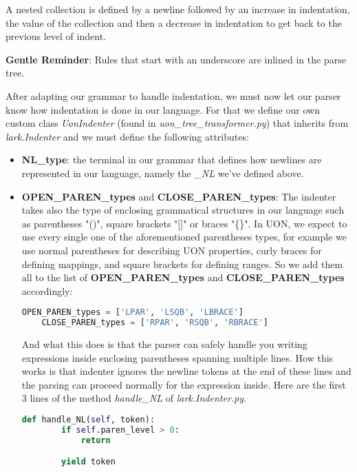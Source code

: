 \documentclass[12pt]{article}
\begin{document}
A nested collection is defined by a newline followed by an increase in indentation, the value of the collection and then a decrease in indentation to get back to the previous level of indent.

\textbf{Gentle Reminder}: Rules that start with an underscore are inlined in the parse tree.

After adapting our grammar to handle indentation, we must now let our parser know how indentation is done in our language. For that we define our own custom class \emph{UonIndenter} (found in \emph{uon\_tree\_transformer.py}) that inherits from \emph{lark.Indenter} and we must define the following attributes:
\begin{itemize}
    \item \textbf{NL\_type}: the terminal in our grammar that defines how newlines are represented in our language, namely the \emph{\_NL} we've defined above.
    \item \textbf{OPEN\_PAREN\_types} and \textbf{CLOSE\_PAREN\_types}: The indenter takes also the type of enclosing grammatical structures in our language such as parentheses "()", square brackets "[]" or braces "\{\}". In UON, we expect to use every single one of the aforementioned parentheses types, for example we use normal parentheses for describing UON properties, curly braces for defining mappings, and square brackets for defining ranges. So we add them all to the list of \textbf{OPEN\_PAREN\_types} and \textbf{CLOSE\_PAREN\_types} accordingly:
    
    \begin{lstlisting}[language=python]
    OPEN_PAREN_types = ['LPAR', 'LSQB', 'LBRACE']
    CLOSE_PAREN_types = ['RPAR', 'RSQB', 'RBRACE']
    \end{lstlisting}
    
    And what this does is that the parser can safely handle you writing expressions inside enclosing parentheses spanning multiple lines. How this works is that indenter ignores the newline tokens at the end of these lines and the parsing can proceed normally for the expression inside. Here are the first 3 lines of the method \emph{handle\_NL} of \emph{lark.Indenter.py}. 
    
    \begin{lstlisting}[language = python]
    def handle_NL(self, token):
        if self.paren_level > 0:
            return

        yield token
    \end{lstlisting}
    

\end{itemize}
\end{document}
